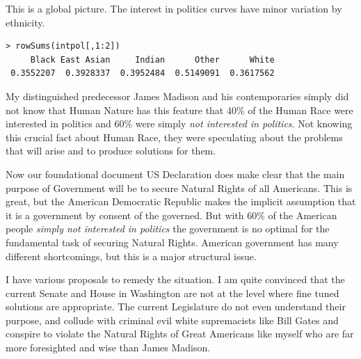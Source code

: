\documentclass{amsart}
\begin{document}
This is a global picture.  The interest in politics curves have minor variation by ethnicity.  

\begin{verbatim}
> rowSums(intpol[,1:2])
     Black East Asian     Indian      Other      White 
 0.3552207  0.3928337  0.3952484  0.5149091  0.3617562 

\end{verbatim}
 
My distinguished predecessor James Madison and his contemporaries simply did not know that Human Nature has this feature that 40\% of the Human Race were interested in politics and 60\% were simply {\em not interested in politics}.  Not knowing this crucial fact about Human Race, they were speculating about the problems that will arise and to produce solutions for them.  

Now our foundational document US Declaration does make clear that the main purpose of Government will be to secure Natural Rights of all Americans.  This is great, but the American Democratic Republic makes the implicit assumption that it is a government by consent of the governed.  But with 60\% of the American people {\em simply not interested in politics} the government is no optimal for the fundamental task of securing Natural Rights.  American government has many different shortcomings, but this is a major structural issue. 

I have various proposals to remedy the situation.  I am quite convinced that the current Senate and House in Washington are not at the level where fine tuned solutions are appropriate.  The current Legislature do not even understand their purpose, and collude with criminal evil white supremacists like Bill Gates and conspire to violate the Natural Rights of Great Americans like myself who are far more foresighted and wise than James Madison.
\end{document}
